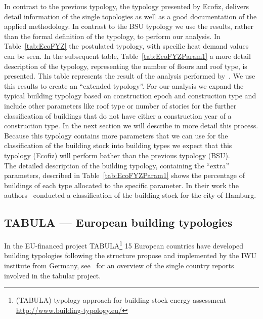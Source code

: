 \documentclass[authoryear,preprint,review,12pt]{elsarticle}
\begin{document}
\begin{linenumbers}
In contrast to the previous typology, the typology presented by Ecofiz,
delivers detail information of the single topologies as well as a good
documentation of the applied methodology.  In contrast to the BSU typology we
use the results, rather than the formal definition of the typology, to perform
our analysis.  In Table~\ref{tab:EcoFYZ} the postulated typology, with specific
heat demand values can be seen.  In the subsequent table,
Table~\ref{tab:EcoFYZParam1} a more detail description of the typology,
representing the number of floors and roof type, is presented.  This table
represents the result of the analysis performed by~\citeauthor{Hermelink.2011}.
We use this results to create an ``extended typology''.  For our analysis we
expand the typical building typology based on construction epoch and
construction type and include other parameters like roof type or number of
stories for the further classification of buildings that do not have either a
construction year of a construction type.  In the next section we will describe
in more detail this process.  Because this typology contains more parameters
that we can use for the classification of the building stock into building
types we expect that this typology (Ecofiz) will perform bather than the
previous typology (BSU).\\

The detailed description of the building typology, containing the ``extra''
parameters, described in Table~\ref{tab:EcoFYZParam1} shows the percentage of
buildings of each type allocated to the specific parameter.  In their work the
authors~\cite{Hermelink.2011} conducted a classification of the building stock
for the city of Hamburg.\\ 



\subsection{TABULA --- European building typologies}\label{sub-sec:tabular}

In the EU-financed project TABULA\footnote{(TABULA) typology approach for
    building stock energy assessment \url{http://www.building-typology.eu/}}
15 European countries have developed building typologies following the
structure propose and implemented by the IWU institute from Germany,
see~\cite{tabulaprojectteam.2012b} for an overview of the single country
reports involved in the tabular project.\\


\end{linenumbers}
\end{document}
